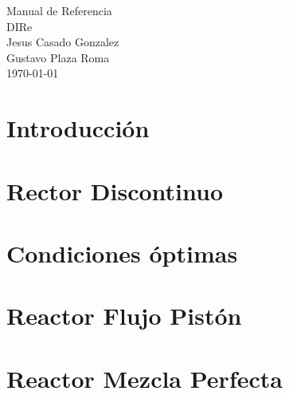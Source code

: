\documentclass[a4paper]{report}
\begin{document}
\hypersetup{pageanchor=false}
\begin{titlepage}
\vspace*{7cm}
\begin{center}
{\Huge Manual de Referencia}\\
\vspace*{1cm}
{\Huge DIRe}\\
\vspace*{1cm}
{\LARGE Jesus Casado Gonzalez}\\
\vspace*{0.5cm}
{\LARGE Gustavo Plaza Roma}\\
\vspace*{0.5cm}
{\Large \today}\\
\end{center}
\end{titlepage}
{}
\tableofcontents
{}
\hypersetup{pageanchor=true}
\chapter{Introducción}

\chapter{Rector Discontinuo}

\chapter{Condiciones óptimas}


\chapter{Reactor Flujo Pistón}

\printindex
\chapter{Reactor Mezcla Perfecta}


\printindex
\end{document}
